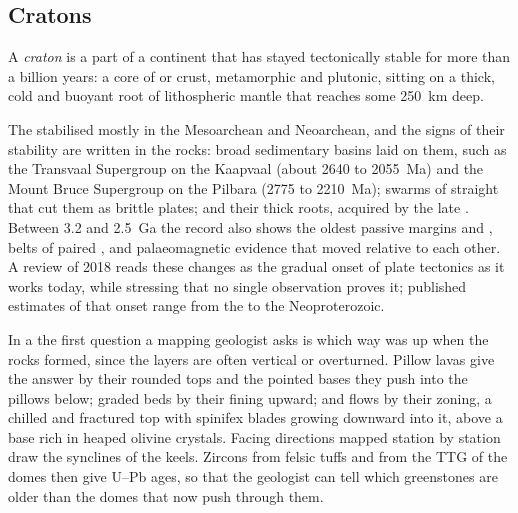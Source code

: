 \subsection*{Cratons}

\begin{definition}[Craton]\label{def:b2:precambrian-earth:craton}
A \emph{craton} is a part of a continent that has stayed tectonically stable
for more than a billion years: a core of  or  crust, metamorphic and
plutonic, sitting on a thick, cold and buoyant root of lithospheric mantle that reaches some
\qty{250}{km} deep.
\end{definition}

The  stabilised mostly in the Mesoarchean and Neoarchean, and the signs of their
stability are written in the rocks: broad sedimentary basins laid on them, such as the
Transvaal Supergroup on the Kaapvaal  (about 2640 to \qty{2055}{Ma}) and the Mount Bruce
Supergroup on the Pilbara (2775 to \qty{2210}{Ma}); swarms of straight  that cut them as
brittle plates; and their thick roots, acquired by the late . Between 3.2 and
\qty{2.5}{Ga} the record also shows the oldest passive margins and , belts
of paired , and palaeomagnetic evidence that  moved relative to each other.
A review of 2018 reads these changes as the gradual onset of plate tectonics as it works
today, while stressing that no single observation proves it; published estimates of that
onset range from the  to the Neoproterozoic.

\begin{inthefield}
In a  the first question a mapping geologist asks is which way was up when the
rocks formed, since the layers are often vertical or overturned. Pillow lavas give the answer
by their rounded tops and the pointed bases they push into the pillows below; graded beds by
their fining upward; and  flows by their zoning, a chilled and fractured top with
spinifex blades growing downward into it, above a base rich in heaped olivine crystals. Facing
directions mapped station by station draw the synclines of the keels. Zircons from felsic tuffs
and from the TTG of the domes then give U--Pb ages, so that the geologist can tell which
greenstones are older than the domes that now push through them.
\end{inthefield}


